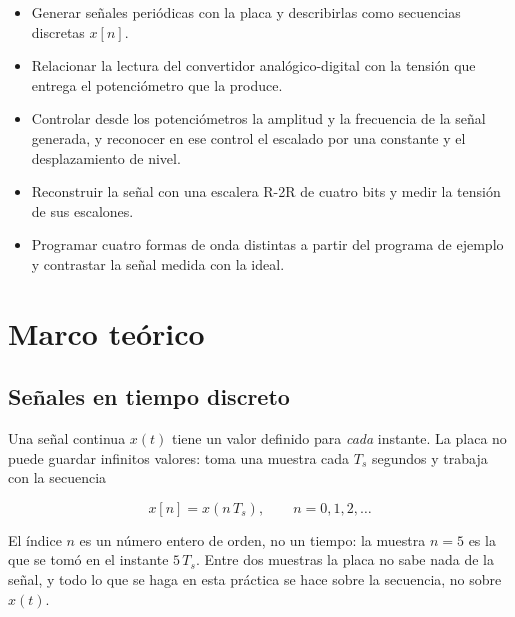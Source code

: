\documentclass[11pt,a4paper]{article}
\begin{document}
\begin{itemize}
    \item Generar señales periódicas con la placa y describirlas como secuencias
          discretas $x[n]$.
    \item Relacionar la lectura del convertidor analógico-digital con la tensión que
          entrega el potenciómetro que la produce.
    \item Controlar desde los potenciómetros la amplitud y la frecuencia de la señal
          generada, y reconocer en ese control el escalado por una constante y el
          desplazamiento de nivel.
    \item Reconstruir la señal con una escalera R-2R de cuatro bits y medir la tensión
          de sus escalones.
    \item Programar cuatro formas de onda distintas a partir del programa de ejemplo y
          contrastar la señal medida con la ideal.
\end{itemize}

\FloatBarrier
\section{Marco teórico}

\subsection{Señales en tiempo discreto}
Una señal continua $x(t)$ tiene un valor definido para \emph{cada} instante. La placa
no puede guardar infinitos valores: toma una muestra cada $T_s$ segundos y trabaja
con la secuencia

\begin{equation}
  x[n] = x(n\,T_s), \qquad n = 0, 1, 2, \dots
\end{equation}

El índice $n$ es un número entero de orden, no un tiempo: la muestra $n = 5$ es la que
se tomó en el instante $5\,T_s$. Entre dos muestras la placa no sabe nada de la señal,
y todo lo que se haga en esta práctica se hace sobre la secuencia, no sobre $x(t)$.
\end{document}
